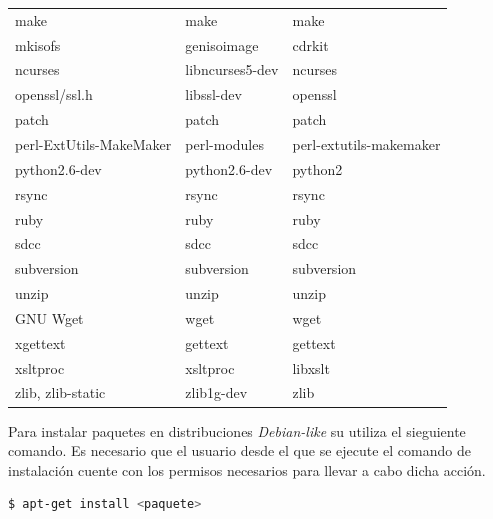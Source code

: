 \documentclass{article}
\begin{document}
\begin{tabular}{|l|l|l|}
                make                    & make              & make                      \\
                mkisofs                 & genisoimage       & cdrkit                    \\
                ncurses                 & libncurses5-dev   & ncurses                   \\
                openssl/ssl.h           & libssl-dev        & openssl                   \\
                patch                   & patch             & patch                     \\
                perl-ExtUtils-MakeMaker & perl-modules      & perl-extutils-makemaker   \\
                python2.6-dev           & python2.6-dev     & python2                   \\
                rsync                   & rsync             & rsync                     \\
                ruby                    & ruby              & ruby                      \\
                sdcc                    & sdcc              & sdcc                      \\
                subversion              & subversion        & subversion                \\
                unzip                   & unzip             & unzip                     \\
                GNU Wget                & wget              & wget                      \\
                xgettext                & gettext           & gettext                   \\
                xsltproc                & xsltproc          & libxslt                   \\
                zlib, zlib-static       & zlib1g-dev        & zlib                      \\
                \hline
            \end{tabular}

        Para instalar paquetes en distribuciones \textit{Debian-like}  su utiliza el sieguiente comando.
        Es necesario que el usuario desde el que se ejecute el comando de instalación cuente con los permisos necesarios para llevar a cabo dicha acción.

        \begin{lstlisting}[language=bash]
            $ apt-get install <paquete>
        \end{lstlisting}
\end{document}
